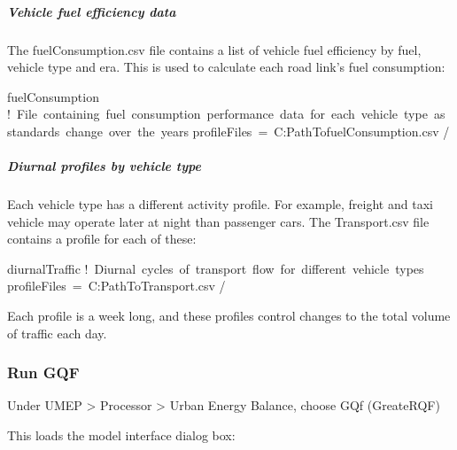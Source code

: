 \documentclass[letterpaper,10pt,english]{sphinxmanual}
\begin{document}
\subparagraph{Vehicle fuel efficiency data}
\label{\detokenize{Tutorials/GQF:vehicle-fuel-efficiency-data}}
The fuelConsumption.csv file contains a list of vehicle fuel efficiency
by fuel, vehicle type and era. This is used to calculate each road
link’s fuel consumption:

%
\begin{sphinxVerbatim}[commandchars=\\\{\}]
\PYGZam{}fuelConsumption
   ! File containing fuel consumption performance data for each vehicle type as standards change over the years
   profileFiles = \PYGZsq{}C:\PYGZbs{}Path\PYGZbs{}To\PYGZbs{}fuelConsumption.csv\PYGZsq{}
/
\end{sphinxVerbatim}


\subparagraph{Diurnal profiles by vehicle type}
\label{\detokenize{Tutorials/GQF:diurnal-profiles-by-vehicle-type}}
Each vehicle type has a different activity profile. For example, freight
and taxi vehicle may operate later at night than passenger cars. The
Transport.csv file contains a profile for each of these:

%
\begin{sphinxVerbatim}[commandchars=\\\{\}]
\PYGZam{}diurnalTraffic
   ! Diurnal cycles of transport flow for different vehicle types
   profileFiles = \PYGZsq{}C:\PYGZbs{}Path\PYGZbs{}To\PYGZbs{}Transport.csv\PYGZsq{}
/
\end{sphinxVerbatim}

Each profile is a week long, and these profiles control changes to the
total volume of traffic each day.


\subsubsection{Run GQF}
\label{\detokenize{Tutorials/GQF:run-gqf}}
Under UMEP \textgreater{} Processor \textgreater{} Urban Energy Balance, choose GQf (GreateRQF)
\begin{description}
\item[{This loads the model interface dialog box:}] \leavevmode
\begin{figure}[htbp]
\centering
\capstart

\noindent{}
\caption{}\label{\detokenize{Tutorials/GQF:id1}}\end{figure}

\end{description}
\end{document}
